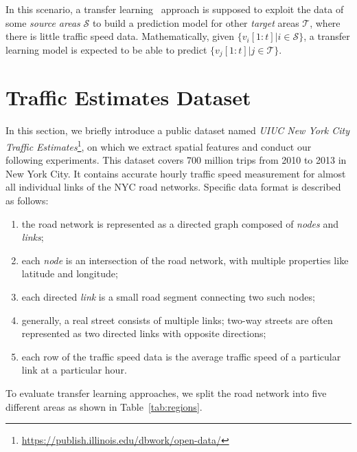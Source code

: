\documentclass[letterpaper]{article} %
\begin{document}
In this scenario, a transfer learning~\cite{Pan:Survey} approach is supposed to exploit the data of some \textit{source areas} $\mathcal{S}$ to build a prediction model for other \textit{target} areas $\mathcal{T}$, where there is little traffic speed data.
Mathematically, given $\{v_i[1:t]|i\in \mathcal{S}\}$, a transfer learning model is expected to be able to predict $\{v_j[1:t]|j\in \mathcal{T}\}$.




\section{Traffic Estimates Dataset}
In this section, we briefly introduce a public dataset named \textit{UIUC New York City Traffic Estimates}\footnote{\url{https://publish.illinois.edu/dbwork/open-data/}}, on which we extract spatial features and conduct our following experiments.
This dataset covers 700 million trips from 2010 to 2013 in New York City. 
It contains accurate hourly traffic speed measurement for almost all individual links of the NYC road networks.
Specific data format is described as follows:
\begin{enumerate}
	\item the road network is represented as a directed graph composed of \textit{nodes} and \textit{links}; 
	\item each \textit{node} is an intersection of the road network, with multiple properties like latitude and longitude;  
	\item each directed \textit{link} is a small road segment connecting two such nodes;   
	\item generally, a real street consists of multiple links;
	two-way streets are often represented as two directed links with opposite directions; 
	\item each row of the traffic speed data is the average traffic speed of a particular link at a particular hour.
\end{enumerate}
To evaluate transfer learning approaches, we split the road network into five different areas as shown in Table~\ref{tab:regions}.
\end{document}
